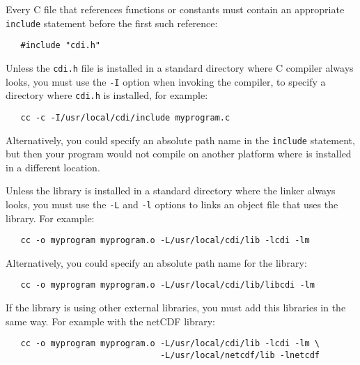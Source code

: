 Every C file that references {\CDI} functions or constants must contain
an appropriate {\tt include} statement before the first such reference:

\begin{verbatim}
   #include "cdi.h"
\end{verbatim}

Unless the {\tt cdi.h} file is installed in a standard directory where
C compiler always looks, you must use the {\tt -I} option when invoking
the compiler, to specify a directory where {\tt cdi.h} is installed, for example:

\begin{verbatim}
   cc -c -I/usr/local/cdi/include myprogram.c
\end{verbatim}

Alternatively, you could specify an absolute path name in the {\tt include}
statement, but then your program would not compile on another platform
where {\CDI} is installed in a different location.

Unless the {\CDI} library is installed in a standard directory where the linker
always looks, you must use the {\tt -L} and {\tt -l} options to links an object file that
uses the {\CDI} library. For example:

\begin{verbatim}
   cc -o myprogram myprogram.o -L/usr/local/cdi/lib -lcdi -lm
\end{verbatim}

Alternatively, you could specify an absolute path name for the library:

\begin{verbatim}
   cc -o myprogram myprogram.o -L/usr/local/cdi/lib/libcdi -lm
\end{verbatim}

If the {\CDI} library is using other external libraries, you must add this
libraries in the same way.
For example with the netCDF library:

\begin{verbatim}
   cc -o myprogram myprogram.o -L/usr/local/cdi/lib -lcdi -lm \
                               -L/usr/local/netcdf/lib -lnetcdf
\end{verbatim}
